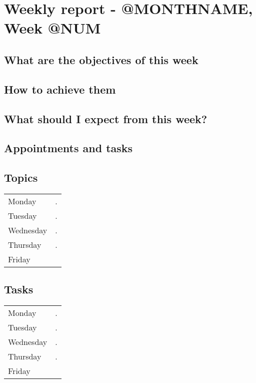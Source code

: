 
\section*{\textbf{Weekly report - @MONTHNAME, Week @NUM}}
\subsection*{What are the objectives of this week}
\subsection*{How to achieve them}
\subsection*{What should I expect from this week?}
\subsection*{Appointments and tasks}
\subsection*{Topics}
	\begin{center}                                                          
	\begin{tabular}{l|p{}} %
	Monday & . \\                                                 
	Tuesday & .\\                                                        
	Wednesday & .\\                                       
	Thursday & . \\       	
	Friday
	\end{tabular}                                                           
        \end{center} 
\subsection*{Tasks}
	\begin{center}                                                          
	\begin{tabular}{l|p{}} %
	Monday & . \\                                                 
	Tuesday & .\\                                                        
	Wednesday & .\\                                       
	Thursday & . \\       	
	Friday
	\end{tabular}                                                           
        \end{center} 
